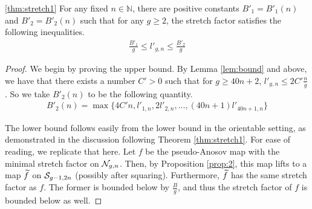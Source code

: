 \begin{manualtheorem}{\ref{thm:stretch1}}
For any fixed $n \in \mathbb{N}$, there are positive constants $B'_1 = B'_1(n)$ and $B'_2 = B'_2(n)$ such that
  for any $g \geq 2$, the stretch factor satisfies the following inequalities.
  \begin{align*}
    \frac{B'_1}{g} \leq l'_{g,n} \leq \frac{B'_2}{g}
  \end{align*}
\end{manualtheorem}
\begin{proof}
  We begin by proving the upper bound. By Lemma \ref{lem:bound} and above, we have that there exists a number
  $C' > 0$ such that for $g \geq 40n + 2$, $l'_{g,n} \leq 2C'\frac{n}{g}$. So we take $B'_2(n)$ to be the
  following quantity.
  \begin{align*}
    B'_2(n) = \max\{4C'n, l'_{1,n}, 2l'_{2,n}, \dots, (40n + 1)l'_{40n+1,n}\}
  \end{align*}

  The lower bound follows easily from the lower bound in the orientable setting, as demonstrated in the
  discussion following Theorem \ref{thm:stretch1}. For ease of reading, we replicate that here.  Let $f$ be
  the pseudo-Anosov map with the minimal stretch factor on $\mathcal{N}_{g,n}$. Then, by Proposition \ref{prop:2},
  this map lifts to a map $\widetilde{f}$ on $\mathcal{S}_{g-1, 2n}$ (possibly after squaring). Furthermore, $\widetilde{f}$ has the
  same stretch factor as $f$. The former is bounded below by $\frac{B}{g}$, and thus the stretch factor of $f$
  is bounded below as well.
\end{proof}
